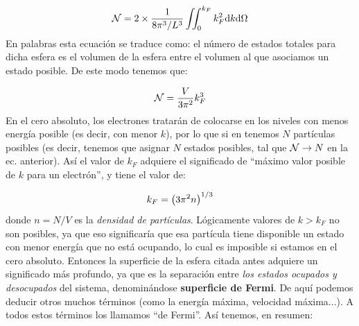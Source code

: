 \begin{equation}
	\mathcal{N} = 2 \times \frac{1}{8\pi^3/L^3} \iint_0^{k_F} k_F^2 \mathrm{d} k \mathrm{d} \Omega
\end{equation}
En palabras esta ecuación se traduce como: el número de estados totales para dicha esfera es el volumen de la esfera entre el volumen al que asociamos un estado posible. De este modo tenemos que:

\begin{equation}
	\mathcal{N} = \frac{V}{3\pi^2} k_F^3
\end{equation}
En el cero absoluto, los electrones tratarán de colocarse en los niveles con menos energía posible (es decir, con menor $k$), por lo que si en tenemos $N$ partículas posibles (es decir, tenemos que asignar $N$ estados posibles, tal que $\mathcal{N} \rightarrow N$ en la ec. anterior). Así el valor de $k_F$ adquiere el significado de ``máximo valor posible de $k$ para un electrón'', y tiene el valor de:

\begin{equation}
	k_F =  \left( 3\pi^2 n \right)^{1/3}
\end{equation}
donde $n=N/V$ es la \textit{densidad de partículas}. Lógicamente valores de $k>k_F$ no son posibles, ya que eso significaría que esa partícula tiene disponible un estado con menor energía que no está ocupando, lo cual es imposible si estamos en el cero absoluto. Entonces la superficie de la esfera citada antes adquiere un significado más profundo, ya que es la separación entre \textit{los estados ocupados y desocupados} del sistema, denominándose \textbf{superficie de Fermi}. De aquí podemos deducir otros muchos términos (como la energía máxima, velocidad máxima...). A todos estos términos los llamamos ``de Fermi''. Así tenemos, en resumen:

